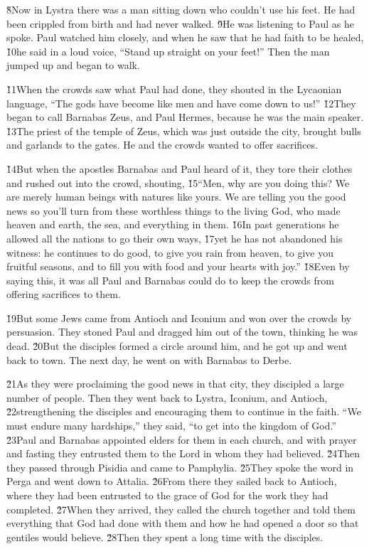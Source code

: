 \v{8}Now in Lystra there was a man sitting down who couldn't use his feet. He had been crippled from birth and had never walked. \v{9}He was listening to Paul as he spoke. Paul watched him closely, and when he saw that he had faith to be healed, \v{10}he said in a loud voice, ``Stand up straight on your feet!'' Then the man jumped up and began to walk.

\v{11}When the crowds saw what Paul had done, they shouted in the Lycaonian language, ``The gods have become like men and have come down to us!'' \v{12}They began to call Barnabas Zeus, and Paul Hermes, because he was the main speaker. \v{13}The priest of the temple of Zeus, which was just outside the city, brought bulls and garlands to the gates. He and the crowds wanted to offer sacrifices.

\v{14}But when the apostles Barnabas and Paul heard of it, they tore their clothes and rushed out into the crowd, shouting, \v{15}``Men, why are you doing this? We are merely human beings with natures like yours. We are telling you the good news so you'll turn from these worthless things to the living God, who made heaven and earth, the sea, and everything in them. \v{16}In past generations he allowed all the nations to go their own ways, \v{17}yet he has not abandoned his witness: he continues to do good, to give you rain from heaven, to give you fruitful seasons, and to fill you with food and your hearts with joy.'' \v{18}Even by saying this, it was all Paul and Barnabas could do to keep the crowds from offering sacrifices to them.

\v{19}But some Jews came from Antioch and Iconium and won over the crowds by persuasion. They stoned Paul and dragged him out of the town, thinking he was dead. \v{20}But the disciples formed a circle around him, and he got up and went back to town. The next day, he went on with Barnabas to Derbe.

\v{21}As they were proclaiming the good news in that city, they discipled a large number of people. Then they went back to Lystra, Iconium, and Antioch, \v{22}strengthening the disciples and encouraging them to continue in the faith. ``We must endure many hardships,'' they said, ``to get into the kingdom of God.'' \v{23}Paul and Barnabas appointed elders for them in each church, and with prayer and fasting they entrusted them to the Lord in whom they had believed. \v{24}Then they passed through Pisidia and came to Pamphylia. \v{25}They spoke the word in Perga and went down to Attalia. \v{26}From there they sailed back to Antioch, where they had been entrusted to the grace of God for the work they had completed. \v{27}When they arrived, they called the church together and told them everything that God had done with them and how he had opened a door so that gentiles would believe. \v{28}Then they spent a long time with the disciples.


